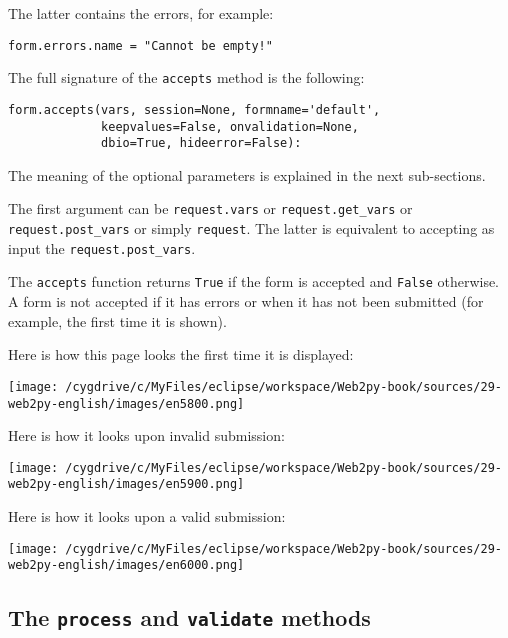\documentclass[justified,sixbynine,notoc]{tufte-book}
\def\ft{\small\tt}
\def\inxx#1{\index{#1}}
\begin{document}
\begin{fullwidth}
The latter contains the errors, for example:
\begin{lstlisting}
form.errors.name = "Cannot be empty!"
\end{lstlisting}

The full signature of the {\ft accepts} method is the following:
\inxx{onvalidation}
\begin{lstlisting}
form.accepts(vars, session=None, formname='default',
             keepvalues=False, onvalidation=None,
             dbio=True, hideerror=False):
\end{lstlisting}

The meaning of the optional parameters is explained in the next sub-sections.

The first argument can be {\ft request.vars} or {\ft request.get\_vars} or {\ft request.post\_vars} or simply {\ft request}. The latter is equivalent to accepting as input the {\ft request.post\_vars}.

The {\ft accepts}  function returns {\ft True} if the form is accepted and {\ft False} otherwise. A form is not accepted if it has errors or when it has not been submitted (for example, the first time it is shown).

Here is how this page looks the first time it is displayed:


\goodbreak\begin{center}\texttt{[image: /cygdrive/c/MyFiles/eclipse/workspace/Web2py-book/sources/29-web2py-english/images/en5800.png]}\end{center}


Here is how it looks upon invalid submission:


\goodbreak\begin{center}\texttt{[image: /cygdrive/c/MyFiles/eclipse/workspace/Web2py-book/sources/29-web2py-english/images/en5900.png]}\end{center}


Here is how it looks upon a valid submission:


\goodbreak\begin{center}\texttt{[image: /cygdrive/c/MyFiles/eclipse/workspace/Web2py-book/sources/29-web2py-english/images/en6000.png]}\end{center}


\goodbreak\subsection{The {\ft process} and {\ft validate} methods}


\end{fullwidth}
\end{document}
